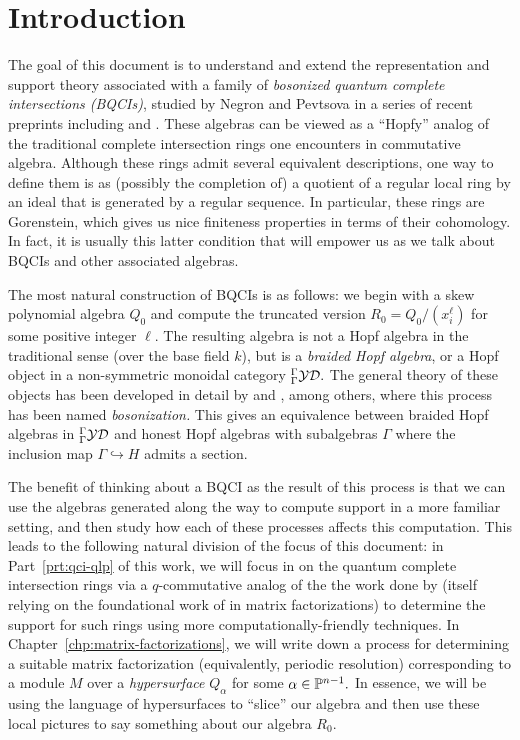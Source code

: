 \documentclass [11pt, proquest] {uwthesis}[2020/02/24]
\begin{document}
\chapter {Introduction}

    The goal of this document is to understand and extend the representation and support theory associated with a family of \textit{bosonized quantum complete intersections (BQCIs)}, studied by Negron and Pevtsova in a series of recent preprints including \cite{negron-pevtsovaI} and \cite{negron-pevtsovaII}. These algebras can be viewed as a ``Hopfy'' analog of the traditional complete intersection rings one encounters in commutative algebra. Although these rings admit several equivalent descriptions, one way to define them is as (possibly the completion of) a quotient of a regular local ring by an ideal that is generated by a regular sequence. In particular, these rings are Gorenstein, which gives us nice finiteness properties in terms of their cohomology. In fact, it is usually this latter condition that will empower us as we talk about BQCIs and other associated algebras.
    
    The most natural construction of BQCIs is as follows: we begin with a skew polynomial algebra $Q_0$ and compute the truncated version $R_0=Q_0/(x_i^\ell)$ for some positive integer $\ell$. The resulting algebra is not a Hopf algebra in the traditional sense (over the base field $k$), but is a \textit{braided Hopf algebra}, or a Hopf object in a non-symmetric monoidal category ${^\Gamma_\Gamma\mathcal{YD}}.$ The general theory of these objects has been developed in detail by \cite{majid-bosonization} and \cite{radford-product}, among others, where this process has been named \textit{bosonization.} This gives an equivalence between braided Hopf algebras in ${^\Gamma_\Gamma\mathcal{YD}}$ and honest Hopf algebras with subalgebras $\Gamma$ where the inclusion map $\Gamma\hookrightarrow H$ admits a section.
    
    The benefit of thinking about a BQCI as the result of this process is that we can use the algebras generated along the way to compute support in a more familiar setting, and then study how each of these processes affects this computation. This leads to the following natural division of the focus of this document: in Part~\ref{prt:qci-qlp} of this work, we will focus in on the quantum complete intersection rings via a $q$-commutative analog of the the work done by \cite{avramov-iyengar} (itself relying on the foundational work of \cite{eisenbud80} in matrix factorizations) to determine the support for such rings using more computationally-friendly techniques. In Chapter~\ref{chp:matrix-factorizations}, we will write down a process for determining a suitable matrix factorization (equivalently, periodic resolution) corresponding to a module $M$ over a \textit{hypersurface} $Q_\alpha$ for some $\alpha\in\mathbb{P}^{n-1}.$ In essence, we will be using the language of hypersurfaces to ``slice'' our algebra and then use these local pictures to say something about our algebra $R_0.$ 
    
\end{document}

